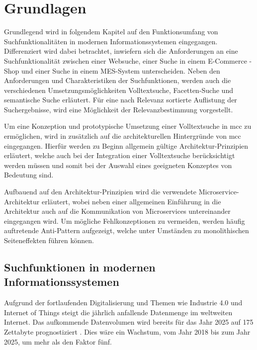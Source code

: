\chapter{Grundlagen\label{chap2:Zweites-Kapitel}}

Grundlegend wird in folgendem Kapitel auf den Funktionsumfang von Suchfunktionalitäten in modernen Informationssystemen eingegangen. Differenziert wird dabei betrachtet, inwiefern sich die Anforderungen an eine Suchfunktionalität zwischen einer Websuche, einer Suche in einem E-Commerce - Shop und einer Suche in einem MES-System unterscheiden. Neben den Anforderungen und Charakteristiken der Suchfunktionen, werden auch die verschiedenen Umsetzungsmöglichkeiten \glqq Volltextsuche\grqq{}, \glqq Facetten-Suche\grqq{} und \glqq semantische Suche\grqq{} erläutert. Für eine nach Relevanz sortierte Auflistung der Suchergebnisse, wird eine Möglichkeit der Relevanzbestimmung vorgestellt.


Um eine Konzeption und prototypische Umsetzung einer Volltextsuche in \gls{mcc} zu ermöglichen, wird in zusätzlich auf die architekturellen Hintergründe von \gls{mcc} eingegangen. Hierfür werden zu Beginn allgemein gültige Architektur-Prinzipien erläutert, welche auch bei der Integration einer Volltextsuche berücksichtigt werden müssen und somit bei der Auswahl eines geeigneten Konzeptes von Bedeutung sind.

Aufbauend auf den Architektur-Prinzipien wird die verwendete Microservice-Architektur erläutert, wobei neben einer allgemeinen Einführung in die Architektur auch auf die Kommunikation von Microservices untereinander eingegangen wird. Um mögliche Fehlkonzeptionen zu vermeiden, werden häufig auftretende Anti-Pattern aufgezeigt, welche unter Umständen zu monolithischen Seiteneffekten führen können.

\section{Suchfunktionen in modernen Informationssystemen\label{sec2.1:Unterpunkt-1}}

Aufgrund der fortlaufenden Digitalisierung und Themen wie \glqq Industrie 4.0\grqq{} und \glqq Internet of Things\grqq{} steigt die jährlich anfallende Datenmenge im weltweiten Internet. Das aufkommende Datenvolumen wird bereits für das Jahr 2025 auf 175 Zettabyte prognostiziert \cite{F.Tenzer.2018}. Dies wäre ein Wachstum, vom Jahr 2018 bis zum Jahr 2025, um mehr als den Faktor fünf.

